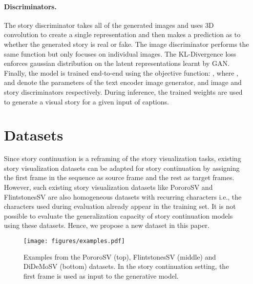 \documentclass[runningheads]{llncs}
\begin{document}
\paragraph{Discriminators.}
The story discriminator takes all of the generated images and uses 3D convolution to create a single representation and then makes a prediction as to whether the generated story is real or fake. The image discriminator performs the same function but only focuses on individual images. The KL-Divergence loss enforces gaussian distribution on the latent representations learnt by GAN. Finally, the model is trained end-to-end using the objective function: , where ,  and  denote the parameters of the text encoder  image generator, and image and story discriminators respectively. During inference, the trained weights  are used to generate a visual story for a given input of captions.



\section{Datasets} \label{sec:datasets}

Since story continuation is a reframing of the story visualization tasks, existing story visualization datasets can be adapted for story continuation by assigning the first frame in the sequence as source frame and the rest as target frames. However, such existing story visualization datasets like PororoSV \cite{li2019storygan} and FlintstonesSV \cite{gupta2018imagine} are also homogeneous datasets with recurring characters i.e., the characters used during evaluation already appear in the training set. It is not possible to evaluate the generalization capacity of story continuation models using these datasets. Hence, we propose a new dataset in this paper.

\begin{figure*}[t]
    \centering
    \texttt{[image: figures/examples.pdf]}
    \caption{Examples from the PororoSV (top), FlintstonesSV (middle) and DiDeMoSV (bottom) datasets. In the story continuation setting, the first frame is used as input to the generative model.}
    \label{fig:example}
\end{figure*}
\end{document}
